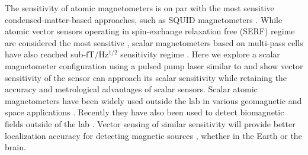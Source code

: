 \documentclass[prx,twocolumn,10pt,nofootinbib]{revtex4-1}
\begin{document}
The sensitivity of atomic magnetometers is on par with the most sensitive condensed-matter-based approaches, such as SQUID magnetometers \cite{storm2017ultra}. While atomic vector sensors operating in spin-exchange relaxation free (SERF) regime are considered the most sensitive \cite{dang2010ultrahigh}, scalar magnetometers based on multi-pass cells have also reached sub-$\mathrm{fT/Hz^{1/2}}$ sensitivity regime \cite{sheng2013subfemtotesla}. Here we explore a scalar magnetometer conﬁguration using a pulsed pump laser similar to \cite{sheng2013subfemtotesla} and show vector sensitivity of the sensor can approach its scalar sensitivity while retaining the accuracy and metrological advantages of scalar sensors. Scalar atomic magnetometers have been widely used outside the lab in various geomagnetic and space applications \cite{slocum1963low}. Recently they have also been used to detect biomagnetic ﬁelds outside of the lab \cite{limes2020portable}. Vector sensing of similar sensitivity will provide better localization accuracy for detecting magnetic sources \cite{wiegert2007demonstration,brookes2021theoretical}, whether in the Earth or the brain.

\end{document}
